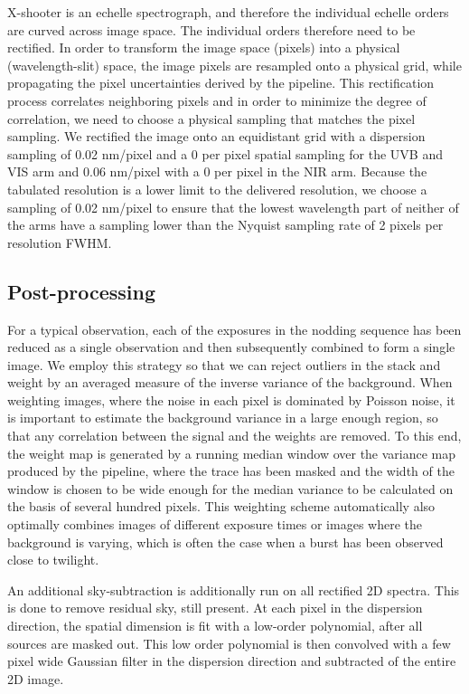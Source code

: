 \documentclass{aa}    %
\begin{document}
X-shooter is an echelle spectrograph, and therefore the individual echelle
orders are curved across image space. The individual orders therefore need to be
rectified. In order to transform the image space (pixels) into a physical
(wavelength-slit) space, the image pixels are resampled onto a physical grid,
while propagating the pixel uncertainties derived by the pipeline. This
rectification  process correlates neighboring pixels and in order to minimize
the degree of correlation, we need to choose a physical sampling that matches
the pixel sampling. We rectified the image onto an equidistant grid with a
dispersion sampling of 0.02 nm/pixel and a 0 per pixel spatial sampling
for the UVB and VIS arm and 0.06 nm/pixel with a 0 per pixel in the NIR
arm.  Because the tabulated resolution is a lower limit to the delivered
resolution, we choose a sampling of 0.02 nm/pixel to ensure that the lowest
wavelength part of neither of the arms have a sampling lower than the Nyquist
sampling rate of 2 pixels per resolution FWHM.

\subsection{Post-processing} \label{postproc}

For a typical observation, each of the exposures in the nodding sequence has
been reduced as a single observation and then subsequently combined to form a
single image. We employ this strategy so that we can reject outliers in the
stack and weight by an averaged measure of the inverse variance of the
background. When weighting images, where the noise in each pixel is dominated by
Poisson noise, it is important to estimate the background variance in a large
enough region, so that any correlation between the signal and the weights are
removed. To this end, the weight map is generated by a running median window
over the variance map produced by the pipeline, where the trace has been masked
and the width of the window is chosen to be wide enough for the median variance to
be calculated on the basis of several hundred pixels. This weighting scheme
automatically also optimally combines images of different exposure times or
images where the background is varying, which is often the case when a burst has
been observed close to twilight.

An additional sky-subtraction is additionally run on all rectified 2D spectra.
This is done to remove residual sky, still present. At each pixel in the
dispersion direction, the spatial dimension is fit with a low-order polynomial,
after all sources are masked out. This low order polynomial is then convolved
with a few pixel wide Gaussian filter in the dispersion direction and subtracted
of the entire 2D image.
\end{document}
